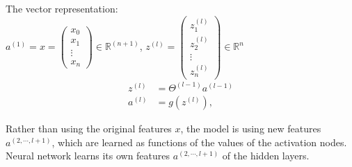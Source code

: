 The vector representation:\\
$a^{(1)} = x = \begin{pmatrix} x_0 \\ x_1 \\ \vdots \\ x_n \end{pmatrix} \in \mathbb{R}^{(n+1)}$, \quad
$z^{(l)} = \begin{pmatrix} z^{(l)} _1 \\ z^{(l)} _2 \\ \vdots \\ z^{(l)} _n \end{pmatrix} \in \mathbb{R}^{n}$\\
\begin{align*}
z^{(l)} &= \Theta^{(l-1)}a^{(l-1)}\\
a^{(l)} &= g(z^{(l)}), 
\end{align*}

Rather than using the original features $x$, the model is using new features $a^{(2, \cdots, l+1)}$, which are learned as functions of the values of the activation nodes. Neural network learns its own features $a^{(2, \cdots, l+1)}$ of the hidden layers.

